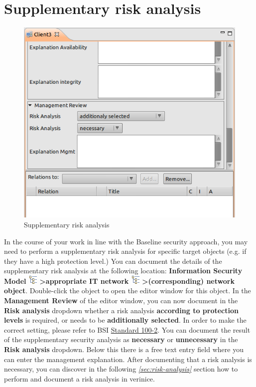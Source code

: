 \documentclass[a4paper,10pt]{book}
\begin{document}
\section{Supplementary risk analysis}\label{sec_risk_analysis}
\begin{figure}[htb!]
  \centering
  \includegraphics[scale=.40]{Screenshot/Sicherheitsanalyse-en.png}
  \caption{\label{Supplementary risk analysis} Supplementary risk analysis}
\end{figure}
In the course of your work in line with the Baseline security approach, you may need to perform a
supplementary risk analysis for specific target objects (e.g. if they have a high protection level.)
You can document the details of the supplementary risk analysis at the following location:
\textbf{Information Security Model \includegraphics[height=2ex]{Icon/GS_Modell.png} \textgreater appropriate IT network
\includegraphics[height=2ex]{Icon/GS_Modell.png} \textgreater (corresponding) network object}.
Double-click the object to open the editor window for this object. In the \textbf{Management Review}
of the editor window, you can now document in the \textbf{Risk analysis} dropdown whether a risk analysis
\textbf{according to protection levels} is required, or needs to be \textbf{additionally selected}.
In order to make the correct setting, please refer to BSI
\href{https://www.bsi.bund.de/DE/Themen/ITGrundschutz/ITGrundschutzStandards/ITGrundschutzStandards_node.html#doc471418bodyText2}{Standard 100-2}.
You can document the result of the supplementary security analysis as \textbf{necessary} or \textbf{unnecessary}
in the \textbf{Risk analysis} dropdown. Below this there is a free text entry field where you can enter the
management explanation. After documenting that a risk analysis is necessary, you can discover in the
following {\em \ref{sec:risk-analysis} } section how to perform and document a risk analysis in verinice.
\end{document}
